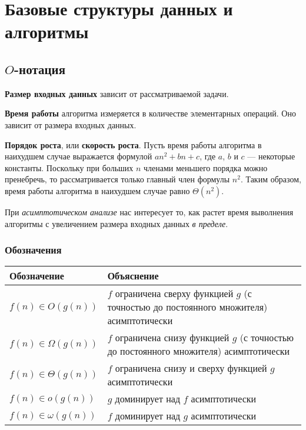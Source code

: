 \chapter{Базовые структуры данных и алгоритмы}
\label{ch:basic-ds}

\section{$O$-нотация}
\label{sec:o-notation}

\textbf{Размер входных данных} зависит от рассматриваемой задачи.

\textbf{Время работы} алгоритма измеряется в количестве элементарных операций. Оно зависит от размера входных данных.

\textbf{Порядок роста}, или \textbf{скорость роста}. Пусть время работы алгоритма в наихудшем случае выражается формулой $an^2 + bn + c$, где $a$, $b$ и $c$ --- некоторые константы. Поскольку при больших $n$ членами меньшего порядка можно пренебречь, то рассматривается только главный член формулы $n^2$. Таким образом, время работы алгоритма в наихудшем случае равно $\Theta(n^2)$.

При \emph{асимптотическом анализе} нас интересует то, как растет время выволнения алгоритмы с увеличением размера входных данных \emph{в пределе}.

\subsection{Обозначения}
\begin{tabular}{lp{11cm}}
  \toprule
  Обозначение & Объяснение \\
  \midrule
  $f(n) \in O(g(n))$ & $f$ ограничена сверху функцией $g$ (с точностью до постоянного множителя) асимптотически \\
  $f(n) \in \Omega(g(n))$ & $f$ ограничена снизу функцией $g$ (с точностью до постоянного множителя) асимптотически \\
  $f(n) \in \Theta(g(n))$ & $f$ ограничена снизу и сверху функцией $g$ асимптотически \\
  $f(n) \in o(g(n))$ & $g$ доминирует над $f$ асимптотически \\
  $f(n) \in \omega(g(n))$ & $f$ доминирует над $g$ асимптотически \\
  \bottomrule
\end{tabular}

